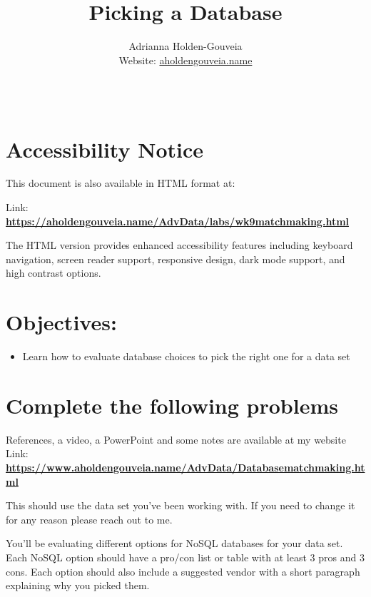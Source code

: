 \documentclass[12pt]{article}
\title{Picking a Database}
\author{
        Adrianna Holden-Gouveia \\
        Website: \href{https://aholdengouveia.name}{aholdengouveia.name}\\ 
        \date{\vspace{-5ex}}
        \faGithub {: aholdengouveia} \\
        }
\begin{document}
    

\maketitle



\section*{Accessibility Notice}
This document is also available in HTML format at:

Link: \href{https://aholdengouveia.name/AdvData/labs/wk9matchmaking.html}{\textbf{https://aholdengouveia.name/AdvData/labs/wk9matchmaking.html}}

The HTML version provides enhanced accessibility features including keyboard navigation, screen reader support, responsive design, dark mode support, and high contrast options.

\section*{Objectives:}
\begin{itemize}
    \item Learn how to evaluate database choices to pick the right one for a data set
\end{itemize}
\section*{Complete the following problems}

References, a video, a PowerPoint and some notes are available at my website
Link: \href{https://www.aholdengouveia.name/AdvData/Databasematchmaking.html}{\textbf{https://www.aholdengouveia.name/AdvData/Databasematchmaking.html}}

This should use the data set you've been working with.  If you need to change it for any reason please reach out to me.

You'll be evaluating different options for NoSQL databases for your data set. Each NoSQL option should have a pro/con list or table with at least 3 pros and 3 cons. Each option should also include a suggested vendor with a short paragraph explaining why you picked them. 
\end{document}
